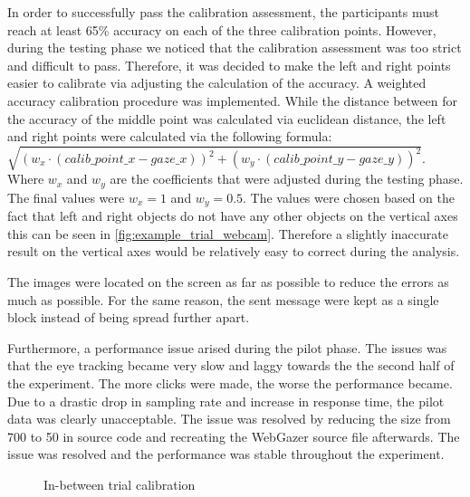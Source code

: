In order to successfully pass the calibration assessment, the participants must reach at least 65\% accuracy on each of the three calibration points. However, during the testing phase we noticed that the calibration assessment was too strict and difficult to pass. Therefore, it was decided to make the left and right points easier to calibrate via adjusting the calculation of the accuracy. A weighted accuracy calibration procedure was implemented. While the distance between for the accuracy of the middle point was calculated via euclidean distance, the left and right points were calculated via the following formula: $\sqrt{(w_x\cdot(calib\_point\_x - gaze\_x))^2 + (w_y\cdot(calib\_point\_y - gaze\_y))^2}$. Where $w_x$ and $w_y$ are the coefficients that were adjusted during the testing phase. The final values were $w_x = 1$ and $w_y = 0.5$. The values were chosen based on the fact that left and right objects do not have any other objects on the vertical axes this can be seen in \autoref{fig:example_trial_webcam}. Therefore a slightly inaccurate result on the vertical axes would be relatively easy to correct during the analysis.

The images were located on the screen as far as possible to reduce the errors as much as possible. For the same reason, the sent message were kept as a single block instead of being spread further apart. 

Furthermore, a performance issue arised during the pilot phase. The issues was that the eye tracking became very slow and laggy towards the the second half of the experiment. The more clicks were made, the worse the performance became. Due to a drastic drop in sampling rate and increase in response time, the pilot data was clearly unacceptable. The issue was resolved by reducing the  size from 700 to 50 in source code and recreating the WebGazer source file afterwards. The issue was resolved and the performance was stable throughout the experiment. 

\begin{figure}
    \centering
    \caption{In-between trial calibration}
    \label{fig:inbetween_calibration_webcam}
\end{figure}


